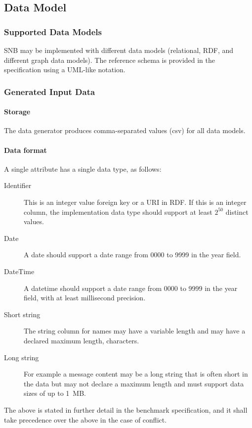 \subsection{Data Model}

\subsubsection{Supported Data Models}

SNB may be implemented with different data models (\eg relational, RDF, and different graph data models). The reference schema is provided in the specification using a UML-like notation. 


\subsubsection{Generated Input Data}
\label{sec:generated-data}

\paragraph{Storage}
The data generator produces comma-separated values (csv) for all data models.

\paragraph{Data format}
A single attribute has a single data type, as follows:
\begin{description}
    \item [Identifier] This is an integer value foreign key or a URI in RDF. If this is an integer column, the implementation data type should support at least $2^{50}$ distinct values.
    \item [Date] A date should support a date range from 0000 to 9999 in the year field.
    \item [DateTime] A datetime should support a date range from 0000 to 9999 in the year field, with at least millisecond precision.
    \item [Short string] The string column for names may have a variable length and may have a declared maximum length,  characters.
    \item [Long string] For example a message content may be a long string that is often short in the data but may not declare a maximum length and must support data sizes of up to 1~MB.
\end{description}

The above is stated in further detail in the benchmark specification, and it shall take precedence over the
above in the case of conflict.


